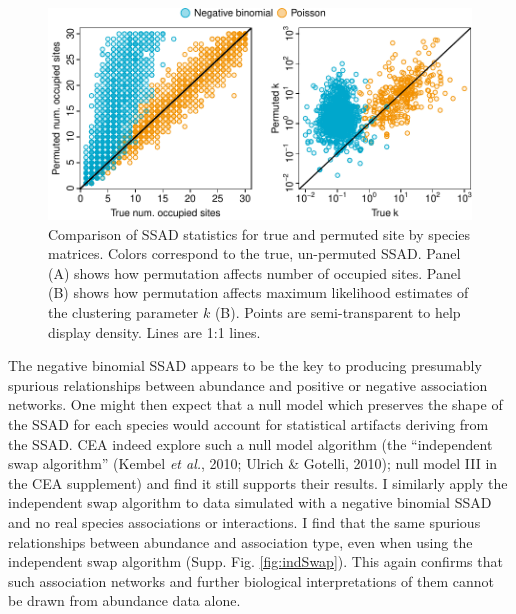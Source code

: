 \documentclass[
]{article}
\begin{document}
\begin{figure}

{\centering \includegraphics{RarePlusComMinus_files/figure-latex/ssadPerm_plot-1} 

}

\caption{Comparison of SSAD statistics for true and permuted site by species matrices. Colors correspond to the true, un-permuted SSAD. Panel (A) shows how permutation affects number of occupied sites. Panel (B) shows how permutation affects maximum likelihood estimates of the clustering parameter $k$ (B). Points are semi-transparent to help display density. Lines are 1:1 lines. \label{fig:ssadPerm}}\label{fig:ssadPerm_plot}
\end{figure}

The negative binomial SSAD appears to be the key to producing presumably
spurious relationships between abundance and positive or negative
association networks. One might then expect that a null model which
preserves the shape of the SSAD for each species would account for
statistical artifacts deriving from the SSAD. CEA indeed explore such a
null model algorithm (the ``independent swap algorithm'' (Kembel
\emph{et al.}, 2010; Ulrich \& Gotelli, 2010); null model III in the CEA
supplement) and find it still supports their results. I similarly apply
the independent swap algorithm to data simulated with a negative
binomial SSAD and no real species associations or interactions. I find
that the same spurious relationships between abundance and association
type, even when using the independent swap algorithm (Supp. Fig.
\ref{fig:indSwap}). This again confirms that such association networks
and further biological interpretations of them cannot be drawn from
abundance data alone.
\end{document}
